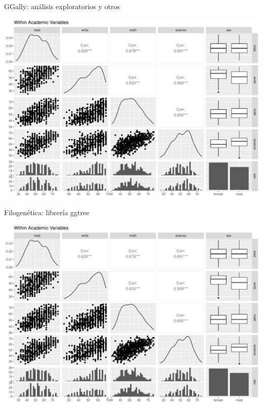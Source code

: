 \documentclass[ignorenonframetext,]{beamer}
\begin{document}
\begin{frame}{GGally: análisis exploratorios y otros}
\protect\hypertarget{ggally-anuxe1lisis-exploratorios-y-otros}{}

\small

\includegraphics{claseIntro_practico12_final_files/figure-beamer/unnamed-chunk-31-1.pdf}

\normalsize

\end{frame}

\begin{frame}{Filogenética: librería ggtree}
\protect\hypertarget{filogenuxe9tica-libreruxeda-ggtree}{}

\small

\includegraphics{claseIntro_practico12_final_files/figure-beamer/unnamed-chunk-32-1.pdf}

\normalsize

\end{frame}
\end{document}
